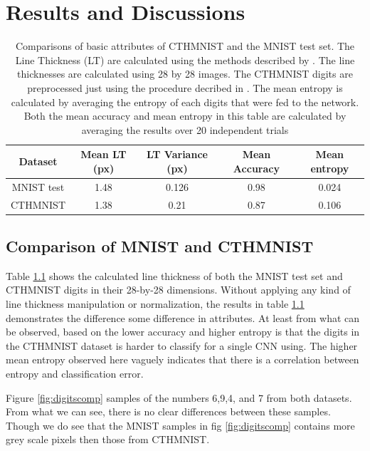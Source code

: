 \chapter{Results and Discussions}

\begin{table}[h]
    \centering
    \begin{tabular}{|c|c|c|c|c|}
        \hline
        Dataset & Mean LT (px) & LT Variance (px) & Mean Accuracy & Mean entropy\\
        \hline
        MNIST test & 1.48 & 0.126 & 0.98 & 0.024\\
        \hline
        CTHMNIST & 1.38 & 0.21 & 0.87 & 0.106\\
        \hline
    \end{tabular}
    \caption{Comparisons of basic attributes of CTHMNIST and the MNIST test set. The Line Thickness (LT) are calculated using the methods described by \cite{kozielski2012moment}. The line thicknesses are calculated using 28 by 28 images. The CTHMNIST digits are preprocessed just using the procedure decribed in \cite{lecunmnist}. The mean entropy is calculated by averaging the entropy of each digits that were fed to the network. Both the mean accuracy and mean entropy in this table are calculated by averaging the results over 20 independent trials}
    \label{tab:datasets}
\end{table}

\section{Comparison of MNIST and CTHMNIST}

Table \ref{tab:datasets} shows the calculated line thickness of both the MNIST test set and CTHMNIST digits in their 28-by-28 dimensions. Without applying any kind of line thickness manipulation or normalization, the results in table \ref{tab:datasets} demonstrates the difference some difference in attributes. At least from what can be observed, based on the lower accuracy and higher entropy is that the digits in the CTHMNIST dataset is harder to classify for a single CNN using. The higher mean entropy observed here vaguely indicates that there is a correlation between entropy and classification error.

Figure \ref{fig:digitscomp} samples of the numbers 6,9,4, and 7 from both datasets. From what we can see, there is no clear differences between these samples. Though we do see that the MNIST samples in fig \ref{fig:digitscomp} contains more grey scale pixels then those from CTHMNIST.


